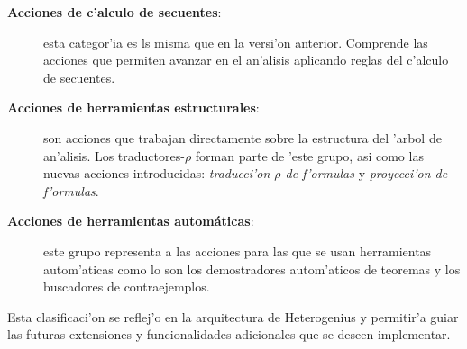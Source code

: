 \begin{description}
\item[\textbf{Acciones de c'alculo de secuentes}:] esta categor'ia es ls misma que en la versi'on anterior. Comprende las acciones que permiten avanzar en el an'alisis aplicando reglas del c'alculo de secuentes.

\item[\textbf{Acciones de herramientas estructurales}:] son acciones que trabajan directamente sobre la estructura del 'arbol de an'alisis. Los traductores-$\rho$ forman parte de 'este grupo, asi como las nuevas acciones introducidas: \textit{traducci'on-$\rho$ de f'ormulas} y \textit{proyecci'on de f'ormulas}.

\item[\textbf{Acciones de herramientas automáticas}:] este grupo representa a las acciones para las que se usan herramientas autom'aticas como lo son los demostradores autom'aticos de teoremas y los buscadores de contraejemplos.
\end{description}

Esta clasificaci'on se reflej'o en la arquitectura de Heterogenius y permitir'a guiar las futuras extensiones y funcionalidades adicionales que se deseen implementar.
